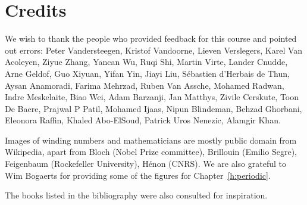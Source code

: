 \chapter{Credits}
\label{h:credits}

We wish to thank the people who provided feedback for this course and pointed out errors: Peter Vandersteegen, Kristof Vandoorne, Lieven Verslegers, Karel Van Acoleyen, Ziyue Zhang, Yancan Wu, Ruqi Shi, Martin Virte, Lander Cnudde, Arne Geldof, Guo Xiyuan, Yifan Yin, Jiayi Liu, S\'ebastien d’Herbais de Thun, Aysan Anamoradi, Farima Mehrzad, Ruben Van Assche, Mohamed Radwan, Indre Meskelaite, Biao Wei, Adam Barzanji, Jan Matthys, Zivile Cerskute, Toon De Baere, Prajwal P Patil, Mohamed Ijaas, Nipun Blindeman, Behzad Ghorbani, Eleonora Raffin, Khaled Abo-ElSoud, Patrick Uros Nenezic, Alamgir Khan.

Images of winding numbers and mathematicians are mostly public domain from Wikipedia, apart from Bloch (Nobel Prize committee), Brillouin (Emilio Segre), Feigenbaum (Rockefeller University), H\'{e}non (CNRS). We are also grateful to Wim Bogaerts for providing some of the figures for Chapter~\ref{h:periodic}.

The books listed in the bibliography were also consulted for inspiration.

